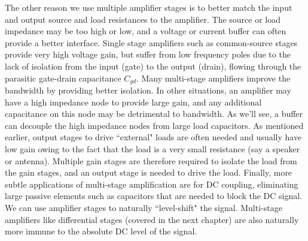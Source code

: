 The other reason we use multiple amplifier stages is to better match the input and output source and load resistances to the amplifier.  The source or load impedance may be too high or low, and a voltage or current buffer can often provide a better interface.  
Single stage amplifiers such as common-source stages provide very high voltage gain, but suffer from low frequency poles due to the lack of isolation from the input (gate) to the output (drain), flowing through the parasitic gate-drain capacitance $C_{gd}$.  Many multi-stage amplifiers improve the bandwidth by providing better isolation.  
In other situations, an amplifier may have a high impedance node to provide large gain, and any additional capacitance on this node may be detrimental to bandwidth.  As we'll see, a buffer can decouple the high impedance nodes from large load capacitors.  
As mentioned earlier, output stages to drive ``external" loads are often needed and usually have low gain owing to the fact that the load is a very small resistance (say a speaker or antenna).  Multiple gain stages are therefore required to isolate the load from the gain stages, and an output stage is needed to drive the load.  
Finally, more subtle applications of multi-stage amplification are for DC coupling, eliminating large passive elements such as capacitors that are needed to block the DC signal.   We can use amplifier stages to naturally ``level-shift" the signal.  Multi-stage amplifiers like differential stages (covered in the next chapter) are also naturally more immune to the absolute DC level of the signal.  
\section{\topicA}

